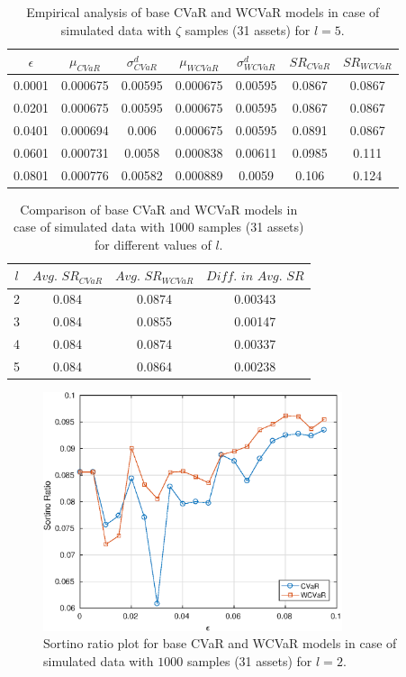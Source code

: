 \documentclass[12pt]{article}
\numberwithin{equation}{section}
\begin{document}
\begin{table}[!h]
\centering
\captionsetup{justification=centering}
\begin{tabular}{||c|c|c|c|c|c|c||}
\hline
$\epsilon$ & $\mu_{CVaR}$ & $\sigma_{CVaR}^{d}$ & $\mu_{WCVaR}$ & $\sigma_{WCVaR}^{d}$ & $SR_{CVaR}$ & $SR_{WCVaR}$\\
\hline
0.0001 & 0.000675 & 0.00595 & 0.000675 & 0.00595 & 0.0867 & 0.0867 \\
0.0201 & 0.000675 & 0.00595 & 0.000675 & 0.00595 & 0.0867 & 0.0867 \\
0.0401 & 0.000694 & 0.006 & 0.000675 & 0.00595 & 0.0891 & 0.0867 \\
0.0601 & 0.000731 & 0.0058 & 0.000838 & 0.00611 & 0.0985 & 0.111 \\
0.0801 & 0.000776 & 0.00582 & 0.000889 & 0.0059 & 0.106 & 0.124 \\
\hline
\end{tabular}
\caption{Empirical analysis of base CVaR and WCVaR models in case of simulated data with $\zeta$ samples (31 assets) for $l=5$.}
\label{tab:6.2}
\end{table}

\begin{table}[!h]
\centering
\captionsetup{justification=centering}
\begin{tabular}{||c|c|c|c||}
\hline
$l$ & $Avg. \, \, SR_{CVaR}$ & $Avg. \, \, SR_{WCVaR}$ & $Diff. \, \, in \, \, Avg. \, \, SR$ \\
\hline
2 & 0.084 & 0.0874 & 0.00343 \\
3 & 0.084 & 0.0855 & 0.00147 \\
4 & 0.084 & 0.0874 & 0.00337 \\
5 & 0.084 & 0.0864 & 0.00238 \\
\hline
\end{tabular}
\caption{Comparison of base CVaR and WCVaR models in case of simulated data with $1000$ samples (31 assets) for different values of $l$.}
\label{avgtab:6.3}
\end{table}

\clearpage

\begin{figure}[!h]
\centering
\includegraphics[height=7.0cm]{cvar_30s_1000_2.eps}
\caption{Sortino ratio plot for base CVaR and WCVaR models in case of simulated data with $1000$ samples (31 assets) for $l=2$.}
\label{fig:6.3}
\end{figure}
\end{document}
